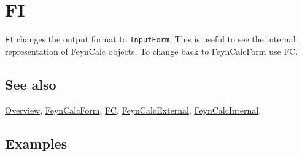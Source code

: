 \documentclass[../FeynCalcManual.tex]{subfiles}
\begin{document}
\hypertarget{fi}{%
\section{FI}\label{fi}}

\texttt{FI} changes the output format to \texttt{InputForm}. This is
useful to see the internal representation of FeynCalc objects. To change
back to FeynCalcForm use FC.

\subsection{See also}

\hyperlink{toc}{Overview}, \hyperlink{feyncalcform}{FeynCalcForm},
\hyperlink{fc}{FC}, \hyperlink{feyncalcexternal}{FeynCalcExternal},
\hyperlink{feyncalcinternal}{FeynCalcInternal}.

\subsection{Examples}
\end{document}
